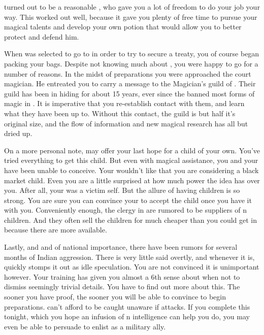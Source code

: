\documentclass[char]{NeptuneBall}
\begin{document}
\cPrince{} turned out to be a reasonable \cPrince{\guy}, who gave you a lot of freedom to do your job your way. This worked out well, because it gave you plenty of free time to pursue your magical talents and develop your own potion that would allow you to better protect and defend him.

When \cPrince{} was selected to go to \pAtlantis{} in order to try to secure a treaty, you of course began packing your bags. Despite not knowing much about \pAtlantis{}, you were happy to go for a number of reasons. In the midst of preparations you were approached the court magician. He entreated you to carry a message to the Magician's guild of \pAtlantis{}.  Their guild has been in hiding for about 15 years, ever since the \cKing{\King} banned most forms of magic in \pAtlantis{}. It is imperative that you re-establish contact with them, and learn what they have been up to. Without this contact, the guild is but half it's original size, and the flow of information and new magical research has all but dried up.

On a more personal note, \pAtlantis{} may offer your last hope for a child of your own.  You've tried everything to get this child. But even with magical assistance, you and your \cVHusband{\spouse} have been unable to conceive. Your \cVHusband{\spouse} wouldn't like that you are considering a black market child. Even you are a little surprised at how much power the idea has over you. After all, your \cSpy{\sibling} was a victim \cSpy{\them}self. But the allure of having children is so strong.  You are sure you can convince your \cVHusband{\spouse} to accept the child once you have it with you.  Conveniently enough, the clergy in \pAtlantis{} are rumored to be suppliers of \pAtlantis{}n children. And they often sell the children for much cheaper than you could get in \pPacifica{} because there are more available.

Lastly, and and of national importance, there have been rumors for several months of Indian aggression. There is very little said overtly, and whenever it is, \cPrince{} quickly stomps it out as idle speculation. You are not convinced it is unimportant however. Your training has given you almost a 6th sense about when not to dismiss seemingly trivial details.  You have to find out more about this. The sooner you have proof, the sooner you will be able to convince \cPrince{} to begin preparations. \pPacifica{} can't afford to be caught unaware if \pIndia{} attacks.  If you complete this tonight, which you hope an infusion of \pAtlantis{}n intelligence can help you do, you may even be able to persuade \cPrince{} to enlist \pAtlantis{} as a military ally.
\end{document}
